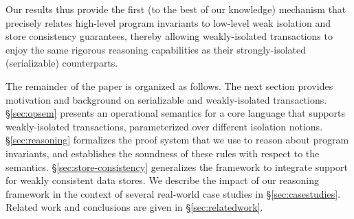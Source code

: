 \noindent Our results thus provide the first (to the best of our
knowledge) mechanism that precisely relates high-level program
invariants to low-level weak isolation and store consistency
guarantees, thereby allowing weakly-isolated transactions to enjoy the
same rigorous reasoning capabilities as their strongly-isolated
(serializable) counterparts.

The remainder of the paper is organized as follows.  The next section
provides motivation and background on serializable and weakly-isolated
transactions. \S\ref{sec:opsem} presents an operational semantics for
a core language that supports weakly-isolated transactions,
parameterized over different isolation notions. \S\ref{sec:reasoning}
formalizes the proof system that we use to reason about program
invariants, and establishes the soundness of these rules with respect
to the semantics. \S\ref{sec:store-consistency} generalizes the
framework to integrate support for weakly consistent data stores.  We
describe the impact of our reasoning framework in the context of
several real-world case studies in \S\ref{sec:casestudies}.  Related
work and conclusions are given in \S\ref{sec:relatedwork}.
